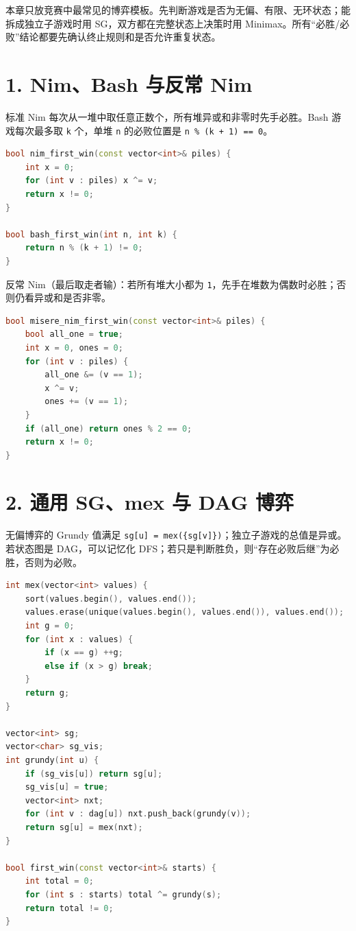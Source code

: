 本章只放竞赛中最常见的博弈模板。先判断游戏是否为无偏、有限、无环状态；能拆成独立子游戏时用 SG，双方都在完整状态上决策时用 Minimax。所有``必胜/必败''结论都要先确认终止规则和是否允许重复状态。

\section{1. Nim、Bash 与反常 Nim}\label{nimbash-ux4e0eux53cdux5e38-nim}

标准 Nim 每次从一堆中取任意正数个，所有堆异或和非零时先手必胜。Bash 游戏每次最多取 \passthrough{\lstinline!k!} 个，单堆 \passthrough{\lstinline!n!} 的必败位置是 \passthrough{\lstinline!n \% (k + 1) == 0!}。

\begin{lstlisting}[language={C++}]
bool nim_first_win(const vector<int>& piles) {
    int x = 0;
    for (int v : piles) x ^= v;
    return x != 0;
}

bool bash_first_win(int n, int k) {
    return n % (k + 1) != 0;
}
\end{lstlisting}

反常 Nim（最后取走者输）：若所有堆大小都为 \passthrough{\lstinline!1!}，先手在堆数为偶数时必胜；否则仍看异或和是否非零。

\begin{lstlisting}[language={C++}]
bool misere_nim_first_win(const vector<int>& piles) {
    bool all_one = true;
    int x = 0, ones = 0;
    for (int v : piles) {
        all_one &= (v == 1);
        x ^= v;
        ones += (v == 1);
    }
    if (all_one) return ones % 2 == 0;
    return x != 0;
}
\end{lstlisting}

\section{2. 通用 SG、mex 与 DAG 博弈}\label{ux901aux7528-sgmex-ux4e0e-dag-ux535aux5f08}

无偏博弈的 Grundy 值满足 \passthrough{\lstinline!sg[u] = mex(\{sg[v]\})!}；独立子游戏的总值是异或。若状态图是 DAG，可以记忆化 DFS；若只是判断胜负，则``存在必败后继''为必胜，否则为必败。

\begin{lstlisting}[language={C++}]
int mex(vector<int> values) {
    sort(values.begin(), values.end());
    values.erase(unique(values.begin(), values.end()), values.end());
    int g = 0;
    for (int x : values) {
        if (x == g) ++g;
        else if (x > g) break;
    }
    return g;
}

vector<int> sg;
vector<char> sg_vis;
int grundy(int u) {
    if (sg_vis[u]) return sg[u];
    sg_vis[u] = true;
    vector<int> nxt;
    for (int v : dag[u]) nxt.push_back(grundy(v));
    return sg[u] = mex(nxt);
}

bool first_win(const vector<int>& starts) {
    int total = 0;
    for (int s : starts) total ^= grundy(s);
    return total != 0;
}
\end{lstlisting}


